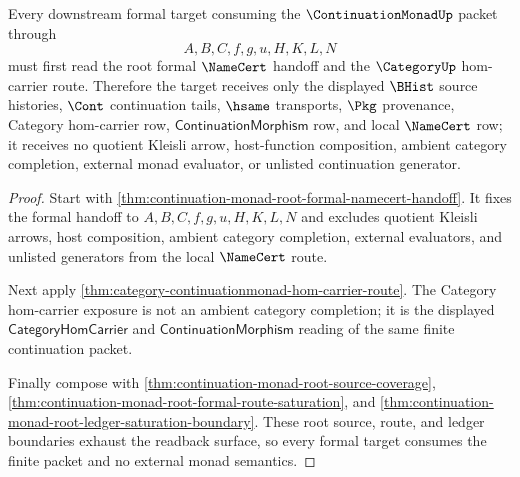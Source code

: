 \begin{theorem}
\label{thm:continuation-monad-formal-target-readback-exhaustion}
Every downstream formal target consuming the $\ContinuationMonadUp$ packet through
$$
A,B,C,f,g,u,H,K,L,N
$$
must first read the root formal $\NameCert$ handoff and the $\CategoryUp$ hom-carrier route. Therefore the target receives only the displayed $\BHist$ source histories, $\Cont$ continuation tails, $\hsame$ transports, $\Pkg$ provenance, Category hom-carrier row, $\mathsf{ContinuationMorphism}$ row, and local $\NameCert$ row; it receives no quotient Kleisli arrow, host-function composition, ambient category completion, external monad evaluator, or unlisted continuation generator.
\end{theorem}
\begin{proof}
Start with \autoref{thm:continuation-monad-root-formal-namecert-handoff}. It fixes the formal handoff to $A,B,C,f,g,u,H,K,L,N$ and excludes quotient Kleisli arrows, host composition, ambient category completion, external evaluators, and unlisted generators from the local $\NameCert$ route.

Next apply \autoref{thm:category-continuationmonad-hom-carrier-route}. The Category hom-carrier exposure is not an ambient category completion; it is the displayed $\mathsf{CategoryHomCarrier}$ and $\mathsf{ContinuationMorphism}$ reading of the same finite continuation packet.

Finally compose with \autoref{thm:continuation-monad-root-source-coverage}, \autoref{thm:continuation-monad-root-formal-route-saturation}, and \autoref{thm:continuation-monad-root-ledger-saturation-boundary}. These root source, route, and ledger boundaries exhaust the readback surface, so every formal target consumes the finite packet and no external monad semantics.
\end{proof}

